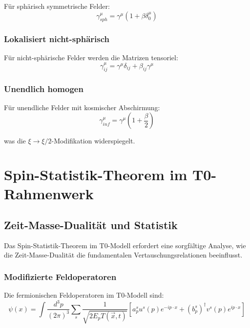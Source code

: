 \documentclass[12pt,a4paper]{article}
\newcommand{\Tfieldt}{T(\vec{x},t)}
\begin{document}
Für sphärisch symmetrische Felder:
\begin{equation}
	\gamma^{\mu}_{sph} = \gamma^{\mu}(1 + \beta \delta^{\mu}_0)
	\label{eq:sphaerische_gamma}
\end{equation}

\subsubsection{Lokalisiert nicht-sphärisch}
\label{subsubsec:nichtsphaerische_matrizen}

Für nicht-sphärische Felder werden die Matrizen tensoriel:
\begin{equation}
	\gamma^{\mu}_{ij} = \gamma^{\mu}\delta_{ij} + \beta_{ij}\gamma^{\mu}
	\label{eq:tensorielle_gamma}
\end{equation}

\subsubsection{Unendlich homogen}
\label{subsubsec:unendliche_matrizen}

Für unendliche Felder mit kosmischer Abschirmung:
\begin{equation}
	\gamma^{\mu}_{inf} = \gamma^{\mu}(1 + \frac{\beta}{2})
	\label{eq:unendliche_gamma}
\end{equation}

was die $\xi \to \xi/2$-Modifikation widerspiegelt.

\section{Spin-Statistik-Theorem im T0-Rahmenwerk}
\label{sec:spin_statistik_t0}

\subsection{Zeit-Masse-Dualität und Statistik}
\label{subsec:zeit_masse_statistik}

Das Spin-Statistik-Theorem im T0-Modell erfordert eine sorgfältige Analyse, wie die Zeit-Masse-Dualität die fundamentalen Vertauschungsrelationen beeinflusst.

\subsubsection{Modifizierte Feldoperatoren}
\label{subsubsec:modifizierte_operatoren}

Die fermionischen Feldoperatoren im T0-Modell sind:
\begin{equation}
	\psi(x) = \int\frac{d^3p}{(2\pi)^3} \sum_s \frac{1}{\sqrt{2E_p\Tfieldt}} \left[a_p^s u^s(p)e^{-ip\cdot x} + (b_p^s)^{\dagger}v^s(p)e^{ip\cdot x}\right]
	\label{eq:t0_feldoperatoren}
\end{equation}
\end{document}
